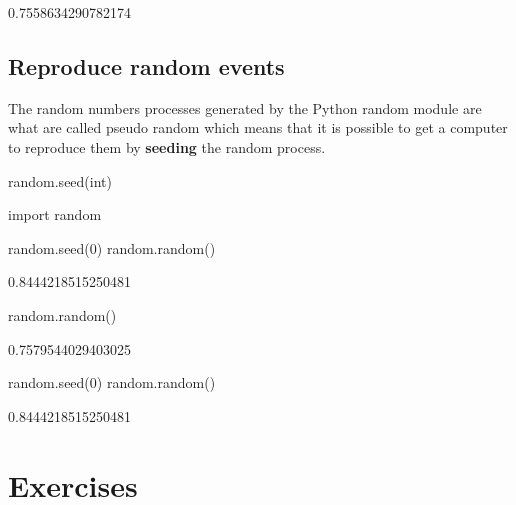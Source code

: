\begin{raw}
0.7558634290782174
\end{raw}






\subsection{Reproduce random events}
\label{sec:reproduce_random_events}

The random numbers processes generated by the Python random module are what are
called pseudo random which means that it is possible to get a computer to reproduce them by
\textbf{seeding} the random process.


\begin{pyin}
random.seed(int)
\end{pyin}





\begin{pyin}
import random

random.seed(0)
random.random()
\end{pyin}





\begin{raw}
0.8444218515250481
\end{raw}







\begin{pyin}
random.random()
\end{pyin}





\begin{raw}
0.7579544029403025
\end{raw}







\begin{pyin}
random.seed(0)
random.random()
\end{pyin}





\begin{raw}
0.8444218515250481
\end{raw}


\section{Exercises}
\label{\detokenize{tools-for-mathematics/06-probability/exercises/main:exercises}}\label{\detokenize{tools-for-mathematics/06-probability/exercises/main::doc}}

